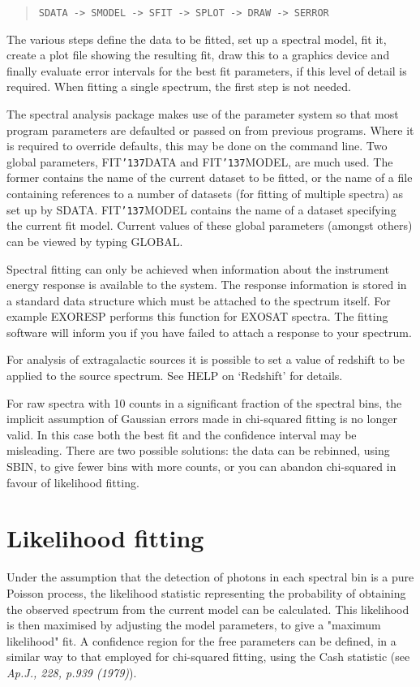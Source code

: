 \documentclass{book}
\renewcommand{\_}{{\tt\char'137}}     %
\begin{document}
\begin{quote}\begin{verbatim}
SDATA -> SMODEL -> SFIT -> SPLOT -> DRAW -> SERROR
\end{verbatim}\end{quote}
The various steps define the data to be fitted, set up a spectral
model, fit it, create a plot file showing the resulting fit, draw
this to a graphics device and finally evaluate error intervals for
the best fit parameters, if this level of detail is required.
When fitting a single spectrum, the first step is not needed.
 
The spectral analysis package makes use of the parameter system
so that most program parameters are defaulted or passed on from
previous programs. Where it is required to override defaults,
this may be done on the command line. Two global parameters,
FIT\_DATA and FIT\_MODEL, are much used. The former contains the
name of the current dataset to be fitted, or the name of a file
containing references to a number of datasets (for fitting of
multiple spectra) as set up by SDATA. FIT\_MODEL contains the name
of a dataset specifying the current fit model. Current values of
these global parameters (amongst others) can be viewed by typing
GLOBAL.
 
Spectral fitting can only be achieved when information about the
instrument energy response is available to the system. The
response information is stored in a standard data structure which
must be attached to the spectrum itself. For example EXORESP performs
this function for EXOSAT spectra. The fitting software will
inform you if you have failed to attach a response to your spectrum.
 
For analysis of extragalactic sources it is possible to set a
value of redshift to be applied to the source spectrum. See HELP
on `Redshift' for details.
 
For raw spectra with 10 counts in a significant fraction of the spectral
bins, the implicit assumption of Gaussian errors made in chi-squared
fitting is no longer valid. In this case both the best fit and the
confidence interval may be misleading. There are two possible solutions:
the data can be rebinned, using SBIN, to give fewer bins with more
counts, or you can abandon chi-squared in favour of
likelihood fitting.
 
\section{Likelihood fitting}
Under the assumption that the detection of photons in each spectral
bin is a pure Poisson process, the likelihood statistic representing
the probability of obtaining the observed spectrum from the current
model can be calculated. This likelihood is then maximised by adjusting
the model parameters, to give a "maximum likelihood" fit. A confidence
region for the free parameters can be defined, in a similar way to
that employed for chi-squared fitting, using the Cash statistic
(see {\em Ap.J., 228, p.939 (1979)}).
 
\end{document}
